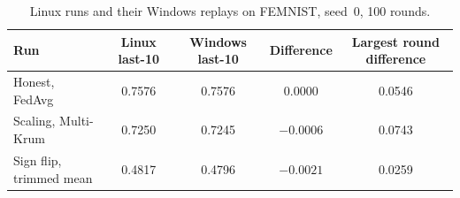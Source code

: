 \begin{table}[H]
\centering
\caption{Linux runs and their Windows replays on FEMNIST, seed~0, 100 rounds.}
\label{tab:platform}
\begin{tabular}{lcccc}
\toprule
Run & Linux last-10 & Windows last-10 & Difference & Largest round difference \\
\midrule
Honest, FedAvg & 0.7576 & 0.7576 & 0.0000 & 0.0546 \\
Scaling, Multi-Krum & 0.7250 & 0.7245 & $-0.0006$ & 0.0743 \\
Sign flip, trimmed mean & 0.4817 & 0.4796 & $-0.0021$ & 0.0259 \\
\bottomrule
\end{tabular}
\end{table}
